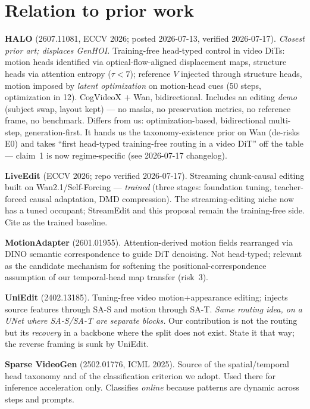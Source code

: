 \documentclass{article}
\begin{document}
\section{Relation to prior work}

\textbf{HALO} (2607.11081, ECCV 2026; posted 2026-07-13, verified 2026-07-17).
\emph{Closest prior art; displaces GenHOI.} Training-free head-typed control
in video DiTs: motion heads identified via optical-flow-aligned displacement
maps, structure heads via attention entropy ($\tau < 7$); reference $V$
injected through structure heads, motion imposed by \emph{latent optimization}
on motion-head cues (50 steps, optimization in 12). CogVideoX $+$ Wan,
bidirectional. Includes an editing \emph{demo} (subject swap, layout kept) ---
no masks, no preservation metrics, no reference frame, no benchmark. Differs
from us: optimization-based, bidirectional multi-step, generation-first. It
hands us the taxonomy-existence prior on Wan (de-risks E0) and takes ``first
head-typed training-free routing in a video DiT'' off the table --- claim~1 is
now regime-specific (see 2026-07-17 changelog).

\textbf{LiveEdit} (ECCV 2026; repo verified 2026-07-17). Streaming
chunk-causal editing built on Wan2.1/Self-Forcing --- \emph{trained} (three
stages: foundation tuning, teacher-forced causal adaptation, DMD compression).
The streaming-editing niche now has a tuned occupant; StreamEdit and this
proposal remain the training-free side. Cite as the trained baseline.

\textbf{MotionAdapter} (2601.01955). Attention-derived motion fields
rearranged via DINO semantic correspondence to guide DiT denoising. Not
head-typed; relevant as the candidate mechanism for softening the
positional-correspondence assumption of our temporal-head map transfer
(risk~3).

\textbf{UniEdit} (2402.13185). Tuning-free video motion+appearance editing;
injects source features through SA-S and motion through SA-T. \emph{Same routing
idea, on a UNet where SA-S/SA-T are separate blocks.} Our contribution is not the
routing but its \emph{recovery} in a backbone where the split does not exist.
State it that way; the reverse framing is sunk by UniEdit.

\textbf{Sparse VideoGen} (2502.01776, ICML 2025). Source of the spatial/temporal
head taxonomy and of the classification criterion we adopt. Used there for
inference acceleration only. Classifies \emph{online} because patterns are
dynamic across steps and prompts.
\end{document}
